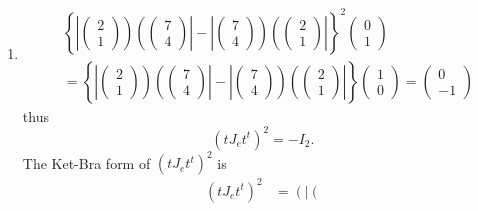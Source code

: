 \documentclass[aps,preprint]{revtex4}
\begin{document}
\begin{enumerate}
\item 
\begin{align}
& \left\{ \left\vert \left( 
\begin{array}{c}
2 \\ 
1%
\end{array}%
\right) \right) \left( \left( 
\begin{array}{c}
7 \\ 
4%
\end{array}%
\right) \right\vert -\left\vert \left( 
\begin{array}{c}
7 \\ 
4%
\end{array}%
\right) \right) \left( \left( 
\begin{array}{c}
2 \\ 
1%
\end{array}%
\right) \right\vert \right\} ^{2}\left( 
\begin{array}{c}
0 \\ 
1%
\end{array}%
\right) \\
& =\left\{ \left\vert \left( 
\begin{array}{c}
2 \\ 
1%
\end{array}%
\right) \right) \left( \left( 
\begin{array}{c}
7 \\ 
4%
\end{array}%
\right) \right\vert -\left\vert \left( 
\begin{array}{c}
7 \\ 
4%
\end{array}%
\right) \right) \left( \left( 
\begin{array}{c}
2 \\ 
1%
\end{array}%
\right) \right\vert \right\} \left( 
\begin{array}{c}
1 \\ 
0%
\end{array}%
\right) =\left( 
\begin{array}{c}
0 \\ 
-1%
\end{array}%
\right)
\end{align}%
thus 
\begin{equation}
\left( tJ_{e}t^{t}\right) ^{2}=-I_{2}.
\end{equation}%
The Ket-Bra form of $\left( tJ_{e}t^{t}\right) ^{2}$ is 
\begin{align}
\left( tJ_{e}t^{t}\right) ^{2}& =\left( \left\vert \left( 

\end{align}
\end{enumerate}
\end{document}
